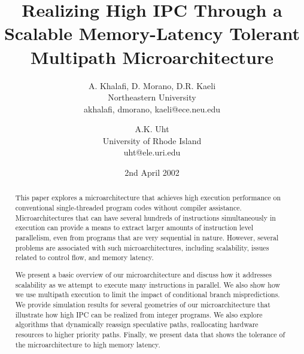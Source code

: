 \documentclass[10pt,dvips]{article}
\begin{document}
\parskip 2mm
%
%
\title{Realizing High IPC Through a Scalable Memory-Latency Tolerant
Multipath Microarchitecture}
%
\author{
A. Khalafi, D. Morano, D.R. Kaeli\\
Northeastern University\\
{akhalafi, dmorano, kaeli}@ece.neu.edu\\
\and
A.K. Uht \\
University of Rhode Island\\ 
uht@ele.uri.edu
}
%
%
\date{2nd April 2002}
%
%
\maketitle
%
\begin{abstract}
This paper explores a microarchitecture that achieves high execution
performance on conventional single-threaded program codes without
compiler assistance.  Microarchitectures that can have several hundreds
of instructions simultaneously in execution can provide a means to extract
larger amounts of instruction level parallelism, even from programs
that are very sequential in nature.  However, several problems are
associated with such microarchitectures, including scalability,
issues related to control flow, and memory latency.

We present a basic overview of our microarchitecture and discuss how it
addresses scalability as we attempt to execute many instructions 
in parallel.
We also show how we use
multipath execution to limit the impact of 
conditional branch mispredictions.  We provide simulation results for several
geometries of our microarchitecture that illustrate how high IPC
can be realized from integer programs.  We also explore algorithms
that dynamically reassign speculative paths, reallocating hardware 
resources to higher priority paths. 
Finally, we present data that shows the
tolerance of the microarchitecture to
high memory latency.
\end{abstract}
%
%
\end{document}
